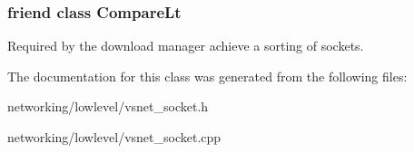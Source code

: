\subsubsection[{\texorpdfstring{Compare\+Lt}{CompareLt}}]{\setlength{\rightskip}{0pt plus 5cm}friend class {\bf Compare\+Lt}\hspace{0.3cm}{\ttfamily [friend]}}\hypertarget{classSOCKETALT_a1501d9e28f48d093461da1163dab2e4e}{}\label{classSOCKETALT_a1501d9e28f48d093461da1163dab2e4e}
Required by the download manager achieve a sorting of sockets. 

The documentation for this class was generated from the following files\+:\begin{DoxyCompactItemize}
\item 
networking/lowlevel/vsnet\+\_\+socket.\+h\item 
networking/lowlevel/vsnet\+\_\+socket.\+cpp\end{DoxyCompactItemize}
